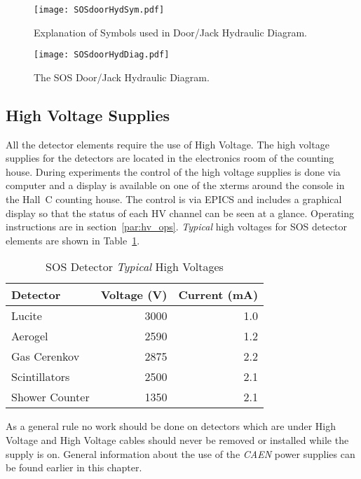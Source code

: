 \begin{figure}
\texttt{[image: SOSdoorHydSym.pdf]}
\caption{Explanation of Symbols used in Door/Jack Hydraulic 
Diagram. \label{fig:SOSdoorHydSym}}
\end{figure}
\clearpage

\begin{figure}
\texttt{[image: SOSdoorHydDiag.pdf]}
\caption{The SOS Door/Jack Hydraulic Diagram. \label{fig:SOSdoorHydDiag}}
\end{figure}
\clearpage


\subsection{High Voltage Supplies }

All the detector elements require the use of High Voltage. The
high voltage supplies for the detectors are located in the 
electronics room of the counting house.
During experiments the control of the high voltage supplies is done via
computer and a display is available on one of the xterms around
the console in the Hall~C counting house. The control is via
EPICS and includes a graphical display so that the status of each
HV channel can be seen at a glance. Operating instructions are
in section~\ref{par:hv_ops}. {\em Typical} high voltages for
SOS detector elements are shown in Table~\ref{tab:sos_hv}.

\begin{table}[!hbt]\centering
   \caption{SOS Detector {\em Typical} High Voltages\label{tab:sos_hv}}
   \begin{tabular}{lrr}
      Detector & Voltage (V) & Current (mA)\\
      \hline
      Lucite         & 3000  & 1.0 \\
      Aerogel        & 2590  & 1.2 \\
      Gas Cerenkov   & 2875  & 2.2 \\
      Scintillators  & 2500  & 2.1 \\
      Shower Counter & 1350  & 2.1 \\
      \hline
   \end{tabular}
\end{table}

As a general rule no work should be done on detectors which are under
High Voltage and
High Voltage cables should never be removed or installed while the supply is on.
General information about the use of the {\em CAEN} power supplies can be
found earlier in this chapter.



